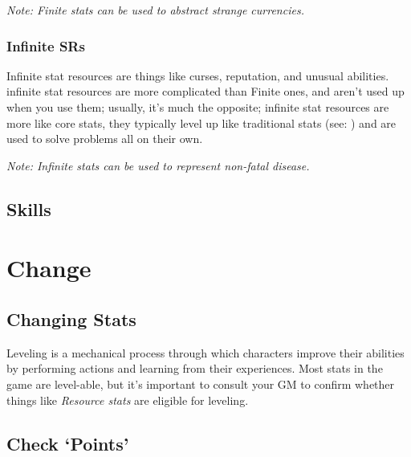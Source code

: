 \documentclass[../main.tex]{subfiles}
\begin{document}
        \emph{Note: Finite stats can be used to abstract strange currencies.}
        \begin{mdframed}[style=Arrata]
            {\em
                \lipsum[1]
            }
        \end{mdframed}

        \subsubsection{Infinite SRs}

        Infinite stat resources are things like curses, reputation, and unusual abilities. infinite stat resources are more complicated than Finite ones, and aren't used up when you use them; usually, it's much the opposite; infinite stat resources are more like core stats, they typically level up like traditional stats (see: {}) and are used to solve problems all on their own.

        \emph{Note: Infinite stats can be used to represent non-fatal disease.}
        \begin{mdframed}[style=Arrata]
            {\em
                \lipsum[1]
            }
        \end{mdframed}

    \subsection{Skills}

    \section{Change}

    \subsection{Changing Stats}\label{changing stats}

    Leveling is a mechanical process through which characters improve their abilities by performing actions and learning from their experiences. Most stats in the game are level-able, but it's important to consult your GM to confirm whether things like \emph{Resource stats} are eligible for leveling.

    \subsection{Check `Points'}
\end{document}
